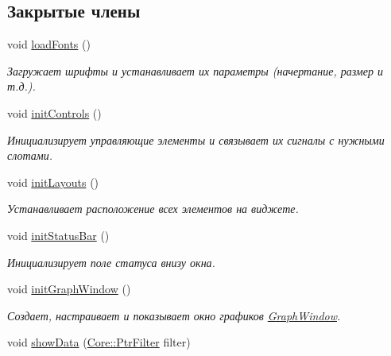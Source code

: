 \subsection*{Закрытые члены}
\begin{DoxyCompactItemize}
\item 
void \hyperlink{class_main_window_af0898886d5a3e9c0b336312e959daae6}{load\+Fonts} ()
\begin{DoxyCompactList}\small\item\em Загружает шрифты и устанавливает их параметры (начертание, размер и т.\+д.). \end{DoxyCompactList}\item 
void \hyperlink{class_main_window_ae2496e2e0162c1916db2a855dc2ca282}{init\+Controls} ()\hypertarget{class_main_window_ae2496e2e0162c1916db2a855dc2ca282}{}\label{class_main_window_ae2496e2e0162c1916db2a855dc2ca282}

\begin{DoxyCompactList}\small\item\em Инициализирует управляющие элементы и связывает их сигналы с нужными слотами. \end{DoxyCompactList}\item 
void \hyperlink{class_main_window_a2e43acb16129df179b891a7f5d2c3694}{init\+Layouts} ()\hypertarget{class_main_window_a2e43acb16129df179b891a7f5d2c3694}{}\label{class_main_window_a2e43acb16129df179b891a7f5d2c3694}

\begin{DoxyCompactList}\small\item\em Устанавливает расположение всех элементов на виджете. \end{DoxyCompactList}\item 
void \hyperlink{class_main_window_ab03270fd7d6947737a5e3d57684c8547}{init\+Status\+Bar} ()\hypertarget{class_main_window_ab03270fd7d6947737a5e3d57684c8547}{}\label{class_main_window_ab03270fd7d6947737a5e3d57684c8547}

\begin{DoxyCompactList}\small\item\em Инициализирует поле статуса внизу окна. \end{DoxyCompactList}\item 
void \hyperlink{class_main_window_ace6b00b69525fa5b1ce8808c9832dedc}{init\+Graph\+Window} ()\hypertarget{class_main_window_ace6b00b69525fa5b1ce8808c9832dedc}{}\label{class_main_window_ace6b00b69525fa5b1ce8808c9832dedc}

\begin{DoxyCompactList}\small\item\em Создает, настраивает и показывает окно графиков \hyperlink{class_graph_window}{Graph\+Window}. \end{DoxyCompactList}\item 
void \hyperlink{class_main_window_acf98b8c16421088a791c6d3d050ebc2d}{show\+Data} (\hyperlink{namespace_core_afba80c2cb714c7d5793d9bcb9591e156}{Core\+::\+Ptr\+Filter} filter)\hypertarget{class_main_window_acf98b8c16421088a791c6d3d050ebc2d}{}\label{class_main_window_acf98b8c16421088a791c6d3d050ebc2d}


\end{DoxyCompactItemize}
